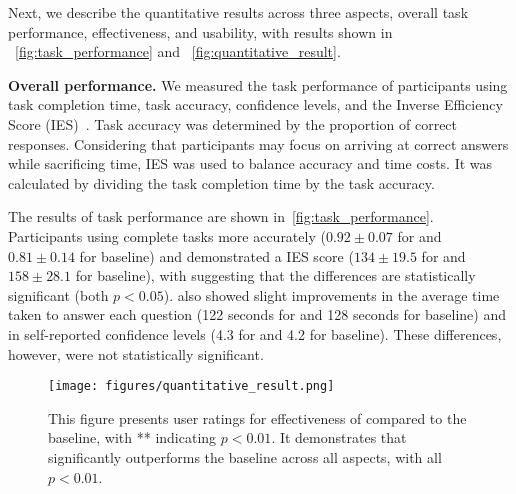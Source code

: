 \label{sec:quantitative_analysis}

Next, we describe the quantitative results across three aspects, \ie overall task performance, effectiveness, and usability, with results shown in ~\autoref{fig:task_performance} and ~\autoref{fig:quantitative_result}.




\textbf{Overall performance.}
We measured the task performance of participants using task completion time, task accuracy, confidence levels, and the Inverse Efficiency Score (IES)~\cite{townsend1983ies, zhi2019linking, shi2020calliope}.
Task accuracy was determined by the proportion of correct responses.
Considering that participants may focus on arriving at correct answers while sacrificing time,  IES was used to balance accuracy and time costs.
It was calculated by dividing the task completion time by the task accuracy.




The results of task performance are shown in~\autoref{fig:task_performance}.
Participants using \tool complete tasks  more accurately ($0.92\pm0.07$ for \tool and $0.81\pm0.14$ for baseline) and demonstrated a  IES score ($134\pm19.5$ for \tool and $158\pm28.1$ for baseline), with  suggesting that the differences are statistically significant (both $p<0.05$).
\tool also showed slight improvements in the average time taken to answer each question (122 seconds for \tool and 128 seconds for baseline) and in self-reported confidence levels (4.3 for \tool and 4.2 for baseline). These differences, however, were not statistically significant.

\begin{figure}[t!]
\textbf  \centering
  \texttt{[image: figures/quantitative\_result.png]}
  \caption{This figure presents user ratings for effectiveness of \tool compared to the baseline, with ** indicating $p<0.01$. It demonstrates that \tool significantly outperforms the baseline across all aspects, with all $p<0.01$.}
  \label{fig:quantitative_result}
  \vspace{-1em}
\end{figure}



